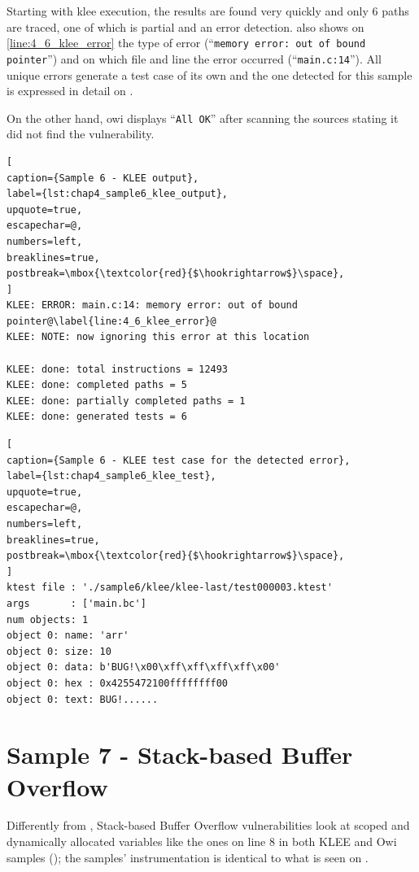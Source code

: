 Starting with klee execution, the results are found very quickly and only 6 paths are traced, one of which is partial and an error detection.  also shows on \cref{line:4_6_klee_error} the type of error (``\lstinline$memory error: out of bound pointer$'') and on which file and line the error occurred (``\lstinline$main.c:14$''). All unique errors generate a test case of its own and the one detected for this sample is expressed in detail on .

On the other hand, owi displays ``\lstinline$All OK$'' after scanning the sources stating it did not find the vulnerability.

\begin{lstlisting}[
caption={Sample 6 - KLEE output},
label={lst:chap4_sample6_klee_output},
upquote=true,
escapechar=@,
numbers=left,
breaklines=true,
postbreak=\mbox{\textcolor{red}{$\hookrightarrow$}\space},
]
KLEE: ERROR: main.c:14: memory error: out of bound pointer@\label{line:4_6_klee_error}@
KLEE: NOTE: now ignoring this error at this location

KLEE: done: total instructions = 12493
KLEE: done: completed paths = 5
KLEE: done: partially completed paths = 1
KLEE: done: generated tests = 6
\end{lstlisting}

\begin{lstlisting}[
caption={Sample 6 - KLEE test case for the detected error},
label={lst:chap4_sample6_klee_test},
upquote=true,
escapechar=@,
numbers=left,
breaklines=true,
postbreak=\mbox{\textcolor{red}{$\hookrightarrow$}\space},
]
ktest file : './sample6/klee/klee-last/test000003.ktest'
args       : ['main.bc']
num objects: 1
object 0: name: 'arr'
object 0: size: 10
object 0: data: b'BUG!\x00\xff\xff\xff\xff\x00'
object 0: hex : 0x4255472100ffffffff00
object 0: text: BUG!......
\end{lstlisting}

\section{Sample 7 - Stack-based Buffer Overflow}\label{section:sample_7}

Differently from , Stack-based Buffer Overflow vulnerabilities look at scoped and dynamically allocated variables like the ones on line 8 in both KLEE and Owi samples (); the samples' instrumentation is identical to what is seen on .

